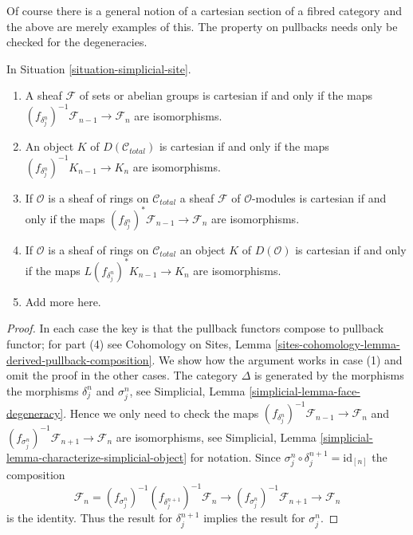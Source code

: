 \noindent
Of course there is a general notion of a cartesian section of a
fibred category and the above are merely examples of this.
The property on pullbacks needs only be checked for the degeneracies.

\begin{lemma}
\label{lemma-check-cartesian-module}
In Situation \ref{situation-simplicial-site}.
\begin{enumerate}
\item A sheaf $\mathcal{F}$ of sets or abelian groups is cartesian
if and only if the maps
$(f_{\delta^n_j})^{-1}\mathcal{F}_{n - 1} \to \mathcal{F}_n$
are isomorphisms.
\item An object $K$ of $D(\mathcal{C}_{total})$ is cartesian
if and only if the maps
$(f_{\delta^n_j})^{-1}K_{n - 1} \to K_n$
are isomorphisms.
\item If $\mathcal{O}$ is a sheaf of rings on $\mathcal{C}_{total}$
a sheaf $\mathcal{F}$ of $\mathcal{O}$-modules is cartesian
if and only if the maps
$(f_{\delta^n_j})^*\mathcal{F}_{n - 1} \to \mathcal{F}_n$
are isomorphisms.
\item If $\mathcal{O}$ is a sheaf of rings on $\mathcal{C}_{total}$
an object $K$ of $D(\mathcal{O})$ is cartesian
if and only if the maps
$L(f_{\delta^n_j})^*K_{n - 1} \to K_n$
are isomorphisms.
\item Add more here.
\end{enumerate}
\end{lemma}

\begin{proof}
In each case the key is that the pullback functors
compose to pullback functor; for part (4) see
Cohomology on Sites, Lemma
\ref{sites-cohomology-lemma-derived-pullback-composition}.
We show how the argument works in case (1) and omit the proof
in the other cases.
The category $\Delta$ is generated by the morphisms
the morphisms $\delta^n_j$ and $\sigma^n_j$, see
Simplicial, Lemma \ref{simplicial-lemma-face-degeneracy}.
Hence we only need to check the maps
$(f_{\delta^n_j})^{-1}\mathcal{F}_{n - 1} \to \mathcal{F}_n$
and $(f_{\sigma^n_j})^{-1}\mathcal{F}_{n + 1} \to \mathcal{F}_n$ are
isomorphisms, see
Simplicial, Lemma \ref{simplicial-lemma-characterize-simplicial-object}
for notation. Since $\sigma^n_j \circ \delta_j^{n + 1} = \text{id}_{[n]}$
the composition
$$
\mathcal{F}_n =
(f_{\sigma^n_j})^{-1}
(f_{\delta_j^{n + 1}})^{-1}
\mathcal{F}_n \to
(f_{\sigma^n_j})^{-1}
\mathcal{F}_{n + 1} \to
\mathcal{F}_n
$$
is the identity. Thus the result for $\delta^{n + 1}_j$ implies the result
for $\sigma^n_j$.
\end{proof}


